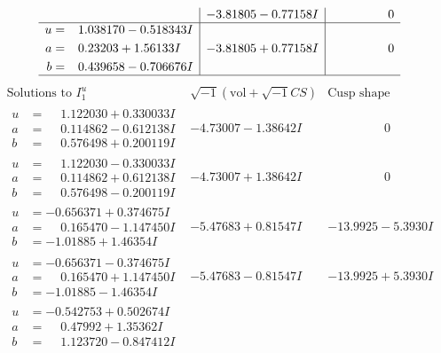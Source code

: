 \documentclass[1p]{elsarticle_modified}
\theoremstyle{definition}
\newcommand{\I}{\sqrt{-1}}
\begin{document}
$$\begin{array}{c|c|c}
 & -3.81805 - 0.77158 I & \phantom{-0.000000 } 0 \\ \hline\begin{aligned}
u &= \phantom{-}1.038170 - 0.518343 I \\
a &= \phantom{-}0.23203 + 1.56133 I \\
b &= \phantom{-}0.439658 - 0.706676 I\end{aligned}
 & -3.81805 + 0.77158 I & \phantom{-0.000000 } 0\\
 \hline 
 \end{array}$$\newpage$$\begin{array}{c|c|c}  
\text{Solutions to }I^u_{1}& \I (\text{vol} + \sqrt{-1}CS) & \text{Cusp shape}\\
 \hline 
\begin{aligned}
u &= \phantom{-}1.122030 + 0.330033 I \\
a &= \phantom{-}0.114862 - 0.612138 I \\
b &= \phantom{-}0.576498 + 0.200119 I\end{aligned}
 & -4.73007 - 1.38642 I & \phantom{-0.000000 } 0 \\ \hline\begin{aligned}
u &= \phantom{-}1.122030 - 0.330033 I \\
a &= \phantom{-}0.114862 + 0.612138 I \\
b &= \phantom{-}0.576498 - 0.200119 I\end{aligned}
 & -4.73007 + 1.38642 I & \phantom{-0.000000 } 0 \\ \hline\begin{aligned}
u &= -0.656371 + 0.374675 I \\
a &= \phantom{-}0.165470 - 1.147450 I \\
b &= -1.01885 + 1.46354 I\end{aligned}
 & -5.47683 + 0.81547 I & -13.9925 - 5.3930 I \\ \hline\begin{aligned}
u &= -0.656371 - 0.374675 I \\
a &= \phantom{-}0.165470 + 1.147450 I \\
b &= -1.01885 - 1.46354 I\end{aligned}
 & -5.47683 - 0.81547 I & -13.9925 + 5.3930 I \\ \hline\begin{aligned}
u &= -0.542753 + 0.502674 I \\
a &= \phantom{-}0.47992 + 1.35362 I \\
b &= \phantom{-}1.123720 - 0.847412 I\end{aligned}

\end{array}$$
\end{document}
